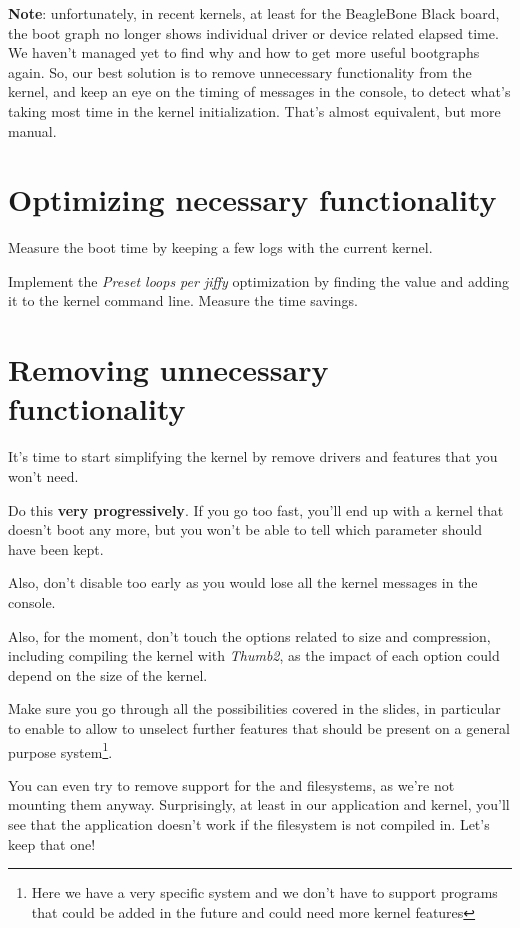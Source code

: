 {\bf Note}: unfortunately, in recent kernels, at least for the BeagleBone Black
board, the boot graph no longer shows individual driver or device
related elapsed time. We haven't managed yet to find why
and how to get more useful bootgraphs again. So, our best solution is
to remove unnecessary functionality from the kernel, and keep an eye
on the timing of messages in the console, to detect what's taking most
time in the kernel initialization. That's almost equivalent, but more
manual.

\section{Optimizing necessary functionality}

Measure the boot time by keeping a few  logs with
the current kernel.

Implement the {\em Preset loops per jiffy} optimization by
finding the  value and adding it to the kernel command line.
Measure the time savings.

\section{Removing unnecessary functionality}

It's time to start simplifying the kernel by remove drivers and features
that you won't need.

Do this {\bf very progressively}. If you go too fast, you'll end up with a
kernel that doesn't boot any more, but you won't be able to tell which
parameter should have been kept.

Also, don't disable  too early
as you would lose all the kernel messages in the console.

Also, for the moment, don't touch the options related to size and
compression, including compiling the kernel with {\em Thumb2}, as the
impact of each option could depend on the size of the kernel.

Make sure you go through all the possibilities covered in the slides, in
particular to enable  to allow to unselect further
features that should be present on a general purpose
system\footnote{Here we have a very specific system and we don't have
to support programs that could be added in the future and could need
more kernel features}.

You can even try to remove support for the  and 
filesystems, as we're not mounting them anyway. Surprisingly, at least
in our application and kernel, you'll see that the application doesn't
work if the  filesystem is not compiled in. Let's keep that
one!

